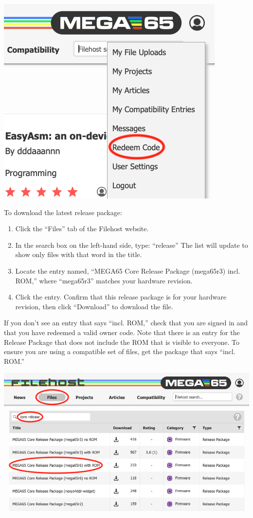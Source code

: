 \begin{center}
  \includegraphics[width=0.4\linewidth]{images/filehost_redeemmenu.png}
\end{center}

To download the latest release package:

\begin{enumerate}
  \item Click the ``Files'' tab of the Filehost website.
  \item In the search box on the left-hand side, type: ``release'' The list will update to show only files with that word in the title.
  \item Locate the entry named, ``MEGA65 Core Release Package (mega65r3) incl. ROM,'' where ``mega65r3'' matches your hardware revision.
  \item Click the entry. Confirm that this release package is for your hardware revision, then click ``Download'' to download the file.
\end{enumerate}

If you don't see an entry that says ``incl. ROM,'' check that you are signed in and that you have redeemed a valid owner code. Note that there is an entry for the Release Package that does not include the ROM that is visible to everyone. To ensure you are using a compatible set of files, get the package that says ``incl. ROM.''

\begin{center}
  \includegraphics[width=0.7\linewidth]{images/filehost_release.png}
\end{center}

